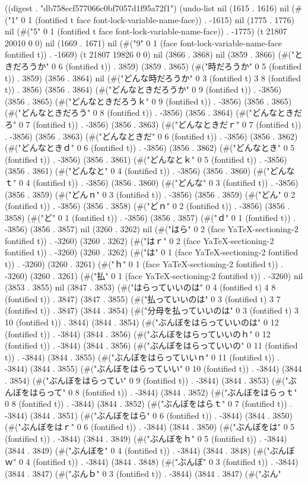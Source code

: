
((digest . "db758ecf577066c0bf7057d1f95a72f1") (undo-list nil (1615 . 1616) nil (#("1" 0 1 (fontified t face font-lock-variable-name-face)) . -1615) nil (1775 . 1776) nil (#("5" 0 1 (fontified t face font-lock-variable-name-face)) . -1775) (t 21807 20010 0 0) nil (1669 . 1671) nil (#("9" 0 1 (face font-lock-variable-name-face fontified t)) . -1669) (t 21807 19826 0 0) nil (3866 . 3868) nil (3859 . 3866) (#("ときだろうか" 0 6 (fontified t)) . 3859) (3859 . 3865) (#("時だろうか" 0 5 (fontified t)) . 3859) (3856 . 3864) nil (#("どんな時だろうか" 0 3 (fontified t) 3 8 (fontified t)) . 3856) (3856 . 3864) (#("どんなときだろうか" 0 9 (fontified t)) . -3856) (3856 . 3865) (#("どんなときだろうｋ" 0 9 (fontified t)) . -3856) (3856 . 3865) (#("どんなときだろう" 0 8 (fontified t)) . -3856) (3856 . 3864) (#("どんなときだろ" 0 7 (fontified t)) . -3856) (3856 . 3863) (#("どんなときだｒ" 0 7 (fontified t)) . -3856) (3856 . 3863) (#("どんなときだ" 0 6 (fontified t)) . -3856) (3856 . 3862) (#("どんなときｄ" 0 6 (fontified t)) . -3856) (3856 . 3862) (#("どんなとき" 0 5 (fontified t)) . -3856) (3856 . 3861) (#("どんなとｋ" 0 5 (fontified t)) . -3856) (3856 . 3861) (#("どんなと" 0 4 (fontified t)) . -3856) (3856 . 3860) (#("どんなｔ" 0 4 (fontified t)) . -3856) (3856 . 3860) (#("どんな" 0 3 (fontified t)) . -3856) (3856 . 3859) (#("どんｎ" 0 3 (fontified t)) . -3856) (3856 . 3859) (#("どん" 0 2 (fontified t)) . -3856) (3856 . 3858) (#("どｎ" 0 2 (fontified t)) . -3856) (3856 . 3858) (#("ど" 0 1 (fontified t)) . -3856) (3856 . 3857) (#("ｄ" 0 1 (fontified t)) . -3856) (3856 . 3857) nil (3260 . 3262) nil (#("はら" 0 2 (face YaTeX-sectioning-2 fontified t)) . -3260) (3260 . 3262) (#("はｒ" 0 2 (face YaTeX-sectioning-2 fontified t)) . -3260) (3260 . 3262) (#("は" 0 1 (face YaTeX-sectioning-2 fontified t)) . -3260) (3260 . 3261) (#("ｈ" 0 1 (face YaTeX-sectioning-2 fontified t)) . -3260) (3260 . 3261) (#("払" 0 1 (face YaTeX-sectioning-2 fontified t)) . -3260) nil (3853 . 3855) nil (3847 . 3853) (#("はらっていいのは" 0 4 (fontified t) 4 8 (fontified t)) . 3847) (3847 . 3855) (#("払っていいのは" 0 3 (fontified t) 3 7 (fontified t)) . 3847) (3844 . 3854) (#("分母を払っていいのは" 0 3 (fontified t) 3 10 (fontified t)) . 3844) (3844 . 3854) (#("ぶんぼをはらっていいのは" 0 12 (fontified t)) . -3844) (3844 . 3856) (#("ぶんぼをはらっていいのｈ" 0 12 (fontified t)) . -3844) (3844 . 3856) (#("ぶんぼをはらっていいの" 0 11 (fontified t)) . -3844) (3844 . 3855) (#("ぶんぼをはらっていいｎ" 0 11 (fontified t)) . -3844) (3844 . 3855) (#("ぶんぼをはらっていい" 0 10 (fontified t)) . -3844) (3844 . 3854) (#("ぶんぼをはらってい" 0 9 (fontified t)) . -3844) (3844 . 3853) (#("ぶんぼをはらって" 0 8 (fontified t)) . -3844) (3844 . 3852) (#("ぶんぼをはらっｔ" 0 8 (fontified t)) . -3844) (3844 . 3852) (#("ぶんぼをはらｔ" 0 7 (fontified t)) . -3844) (3844 . 3851) (#("ぶんぼをはら" 0 6 (fontified t)) . -3844) (3844 . 3850) (#("ぶんぼをはｒ" 0 6 (fontified t)) . -3844) (3844 . 3850) (#("ぶんぼをは" 0 5 (fontified t)) . -3844) (3844 . 3849) (#("ぶんぼをｈ" 0 5 (fontified t)) . -3844) (3844 . 3849) (#("ぶんぼを" 0 4 (fontified t)) . -3844) (3844 . 3848) (#("ぶんぼｗ" 0 4 (fontified t)) . -3844) (3844 . 3848) (#("ぶんぼ" 0 3 (fontified t)) . -3844) (3844 . 3847) (#("ぶんｂ" 0 3 (fontified t)) . -3844) (3844 . 3847) (#("ぶん" 